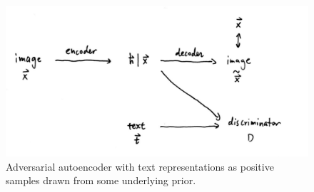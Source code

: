\documentclass{article}
\newcommand{\bb}[1]{\boldsymbol{#1}}
\begin{document}

\begin{figure}[h]
\centering
\includegraphics[width = 10 cm]{figTextPrior}
\caption{Adversarial autoencoder with text representations as positive samples drawn from some underlying prior.}
\label{fig:TextPrior}
\end{figure}







	
	
\end{document}
